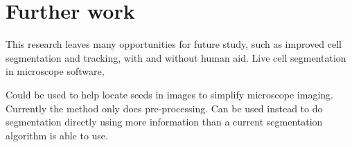 \section{Further work}

This research leaves many opportunities for future study, such as improved cell segmentation and tracking, with and without human aid. Live cell segmentation in microscope software, 

Could be used to help locate seeds in images to simplify microscope imaging.
Currently the method only does pre-processing. Can be used instead to do segmentation directly using more information than a current segmentation algorithm is able to use.
